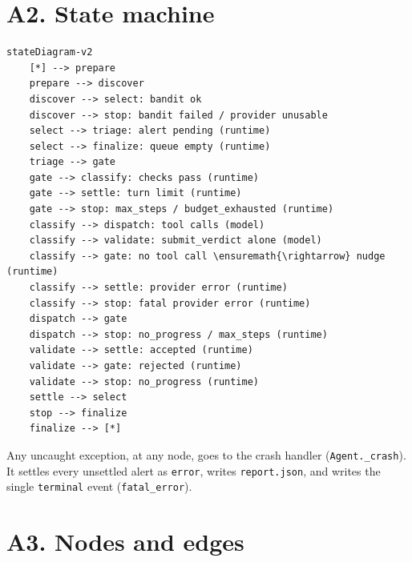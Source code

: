 \documentclass[
  10pt,
]{article}
\begin{document}
\section{A2. State machine}\label{a2.-state-machine}

\begin{verbatim}
stateDiagram-v2
    [*] --> prepare
    prepare --> discover
    discover --> select: bandit ok
    discover --> stop: bandit failed / provider unusable
    select --> triage: alert pending (runtime)
    select --> finalize: queue empty (runtime)
    triage --> gate
    gate --> classify: checks pass (runtime)
    gate --> settle: turn limit (runtime)
    gate --> stop: max_steps / budget_exhausted (runtime)
    classify --> dispatch: tool calls (model)
    classify --> validate: submit_verdict alone (model)
    classify --> gate: no tool call \ensuremath{\rightarrow} nudge (runtime)
    classify --> settle: provider error (runtime)
    classify --> stop: fatal provider error (runtime)
    dispatch --> gate
    dispatch --> stop: no_progress / max_steps (runtime)
    validate --> settle: accepted (runtime)
    validate --> gate: rejected (runtime)
    validate --> stop: no_progress (runtime)
    settle --> select
    stop --> finalize
    finalize --> [*]
\end{verbatim}

Any uncaught exception, at any node, goes to the crash handler
(\texttt{Agent.\_crash}). It settles every unsettled alert as
\texttt{error}, writes \texttt{report.json}, and writes the single
\texttt{terminal} event (\texttt{fatal\_error}).

\section{A3. Nodes and edges}\label{a3.-nodes-and-edges}
\end{document}
